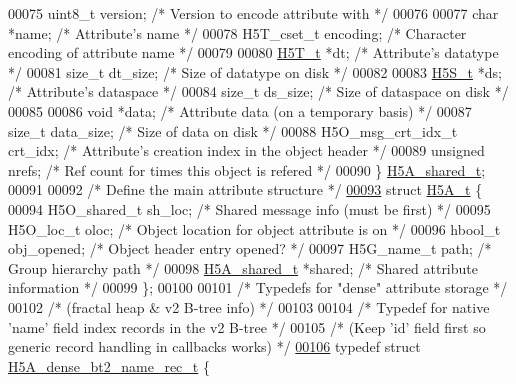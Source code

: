 \begin{DoxyCode}
00075     uint8\_t     version;    \textcolor{comment}{/* Version to encode attribute with */}
00076 
00077     \textcolor{keywordtype}{char}        *name;      \textcolor{comment}{/* Attribute's name */}
00078     H5T\_cset\_t  encoding;   \textcolor{comment}{/* Character encoding of attribute name */}
00079 
00080     \hyperlink{struct_h5_t__t}{H5T\_t}       *dt;        \textcolor{comment}{/* Attribute's datatype */}
00081     \textcolor{keywordtype}{size\_t}      dt\_size;    \textcolor{comment}{/* Size of datatype on disk */}
00082 
00083     \hyperlink{struct_h5_s__t}{H5S\_t}       *ds;        \textcolor{comment}{/* Attribute's dataspace */}
00084     \textcolor{keywordtype}{size\_t}      ds\_size;    \textcolor{comment}{/* Size of dataspace on disk */}
00085 
00086     \textcolor{keywordtype}{void}        *data;      \textcolor{comment}{/* Attribute data (on a temporary basis) */}
00087     \textcolor{keywordtype}{size\_t}      data\_size;  \textcolor{comment}{/* Size of data on disk */}
00088     H5O\_msg\_crt\_idx\_t crt\_idx;  \textcolor{comment}{/* Attribute's creation index in the object header */}
00089     \textcolor{keywordtype}{unsigned}    nrefs;      \textcolor{comment}{/* Ref count for times this object is refered   */}
00090 \} \hyperlink{struct_h5_a__shared__t}{H5A\_shared\_t};
00091 
00092 \textcolor{comment}{/* Define the main attribute structure */}
\hyperlink{struct_h5_a__t}{00093} \textcolor{keyword}{struct }\hyperlink{struct_h5_a__t}{H5A\_t} \{
00094     H5O\_shared\_t sh\_loc;     \textcolor{comment}{/* Shared message info (must be first) */}
00095     H5O\_loc\_t    oloc;       \textcolor{comment}{/* Object location for object attribute is on */}
00096     hbool\_t      obj\_opened; \textcolor{comment}{/* Object header entry opened? */}
00097     H5G\_name\_t   path;       \textcolor{comment}{/* Group hierarchy path */}
00098     \hyperlink{struct_h5_a__shared__t}{H5A\_shared\_t} *shared;    \textcolor{comment}{/* Shared attribute information */}
00099 \};
00100 
00101 \textcolor{comment}{/* Typedefs for "dense" attribute storage */}
00102 \textcolor{comment}{/* (fractal heap & v2 B-tree info) */}
00103 
00104 \textcolor{comment}{/* Typedef for native 'name' field index records in the v2 B-tree */}
00105 \textcolor{comment}{/* (Keep 'id' field first so generic record handling in callbacks works) */}
\hyperlink{struct_h5_a__dense__bt2__name__rec__t}{00106} \textcolor{keyword}{typedef} \textcolor{keyword}{struct }\hyperlink{struct_h5_a__dense__bt2__name__rec__t}{H5A\_dense\_bt2\_name\_rec\_t} \{

\end{DoxyCode}
